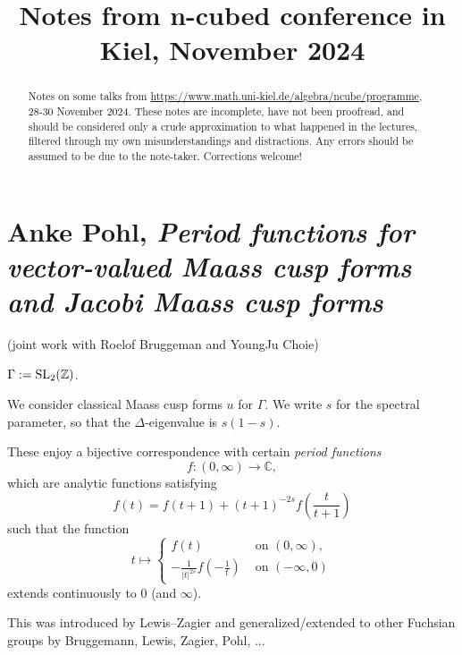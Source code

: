 \documentclass[reqno]{amsart} 
\numberwithin{theorem}{section}
\numberwithin{equation}{section}
\begin{document}
\title{Notes from n-cubed conference in Kiel, November 2024}

\begin{abstract}
  Notes on some talks from \url{https://www.math.uni-kiel.de/algebra/ncube/programme}, 28-30 November 2024.  These notes are incomplete, have not been proofread, and should be considered only a crude approximation to what happened in the lectures, filtered through my own misunderstandings and distractions.  Any errors should be assumed to be due to the note-taker.  Corrections welcome!
\end{abstract}

\maketitle

\tableofcontents

\section{Anke Pohl, \emph{Period functions for vector-valued Maass cusp forms and Jacobi Maass cusp forms}}

(joint work with Roelof Bruggeman and YoungJu Choie)

$\Gamma := \operatorname{SL}_2(\mathbb{Z})$.

We consider classical Maass cusp forms $u$ for $\Gamma$.  We write $s$ for the spectral parameter, so that the $\Delta$-eigenvalue is $s(1 - s)$.

These enjoy a bijective correspondence with certain \emph{period functions}
\begin{equation*}
  f :(0, \infty) \rightarrow \mathbb{C},
\end{equation*}
which are analytic functions satisfying
\begin{equation*}
  f(t) = f(t + 1) +(t + 1)^{- 2 s} f \left( \frac{t}{t + 1} \right)
\end{equation*}
such that the function
\begin{equation*}
  t \mapsto
  \begin{cases}
    f(t)    & \text{ on }(0, \infty), \\
    - \frac{1}{\lvert t \rvert^{2 s}} f\left(- \frac{1}{t}\right)            & \text{ on }(- \infty, 0)
  \end{cases}
\end{equation*}
extends continuously to $0$ (and $\infty$).

This was introduced by Lewis--Zagier and generalized/extended to other Fuchsian groups by Bruggemann, Lewis, Zagier, Pohl, ...
\end{document}
